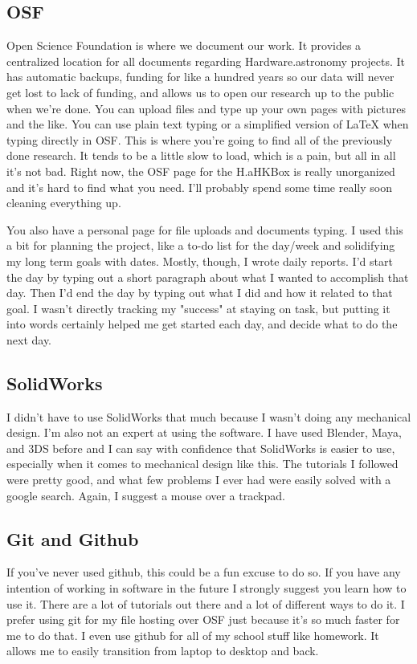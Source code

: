 \documentclass[prb,preprint]{revtex4-1}
\begin{document}
\subsection{OSF}
Open Science Foundation is where we document our work. It provides a centralized location for all documents regarding Hardware.astronomy projects. It has automatic backups, funding for like a hundred years so our data will never get lost to lack of funding, and allows us to open our research up to the public when we're done. You can upload files and type up your own pages with pictures and the like. You can use plain text typing or a simplified version of LaTeX when typing directly in OSF. This is where you're going to find all of the previously done research. It tends to be a little slow to load, which is a pain, but all in all it's not bad. Right now, the OSF page for the H.aHKBox is really unorganized and it's hard to find what you need. I'll probably spend some time really soon cleaning everything up.

You also have a personal page for file uploads and documents typing. I used this a bit for planning the project, like a to-do list for the day/week and solidifying my long term goals with dates. Mostly, though, I wrote daily reports. I'd start the day by typing out a short paragraph about what I wanted to accomplish that day. Then I'd end the day by typing out what I did and how it related to that goal. I wasn't directly tracking my "success" at staying on task, but putting it into words certainly helped me get started each day, and decide what to do the next day.

\subsection{SolidWorks}
I didn't have to use SolidWorks that much because I wasn't doing any mechanical design. I'm also not an expert at using the software. I have used Blender, Maya, and 3DS before and I can say with confidence that SolidWorks is easier to use, especially when it comes to mechanical design like this. The tutorials I followed were pretty good, and what few problems I ever had were easily solved with a google search. Again, I suggest a mouse over a trackpad.

\subsection{Git and Github}
If you've never used github, this could be a fun excuse to do so. If you have any intention of working in software in the future I strongly suggest you learn how to use it. There are a lot of tutorials out there and a lot of different ways to do it. I prefer using git for my file hosting over OSF just because it's so much faster for me to do that. I even use github for all of my school stuff like homework. It allows me to easily transition from laptop to desktop and back.
\end{document}
